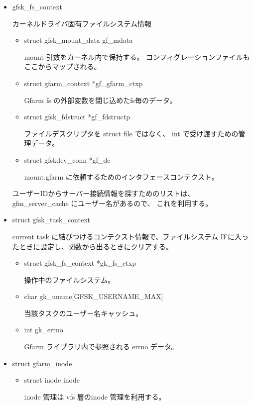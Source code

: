	\begin{itemize}
	\item	gfsk_fs_context	\par
		カーネルドライバ固有ファイルシステム情報
		\begin{itemize}
		\item	struct gfsk_mount_data  gf_mdata	\par
			mount 引数をカーネル内で保持する。
			コンフィグレーションファイルもここからマップされる。
		\item	struct gfarm_context    *gf_gfarm_ctxp	\par
			Gfarm fs の外部変数を閉じ込めたfs毎のデータ。
		\item	struct gfsk_fdstruct    *gf_fdstructp	\par
			ファイルデスクリプタを struct file ではなく、
			int で受け渡すための管理データ。
		\item	struct gfskdev_conn        *gf_dc	\par
			mount.gfarm に依頼するためのインタフェースコンテクスト。
		\end{itemize}

		ユーザーIDからサーバー接続情報を探すためのリストは、
		gfm_server_cache にユーザー名があるので、 これを利用する。

        \item	struct gfsk_task_context \par
		current task に結びつけるコンテクスト情報で、ファイルシステム
		IFに入ったときに設定し、関数から出るときにクリアする。

		\begin{itemize}
		\item	struct gfsk_fs_context *gk_fs_ctxp \par
			操作中のファイルシステム。
		\item	char    gk_uname[GFSK_USERNAME_MAX] \par
			当該タスクのユーザー名キャッシュ。
		\item	int gk_errno \par
			Gfarm ライブラリ内で参照される errno データ。
		\end{itemize}
        \item	struct gfarm_inode \par

		\begin{itemize}
		\item	struct inode         inode \par

		inode 管理は vfs 層のinode 管理を利用する。


\end{itemize}
\end{itemize}
